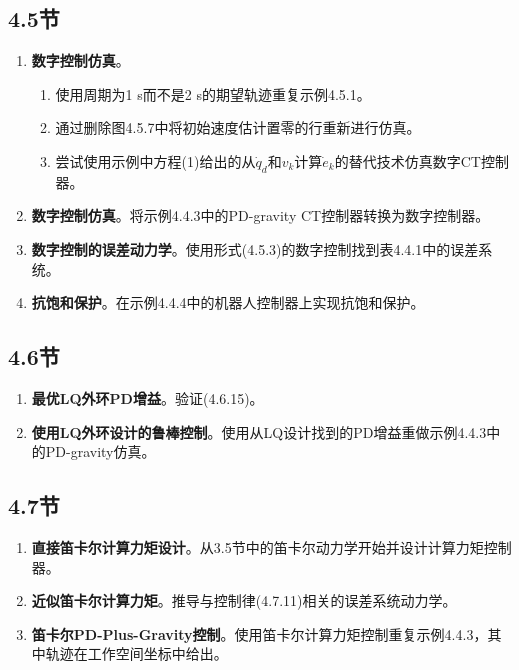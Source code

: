 \documentclass[UTF8]{ctexart}
\theoremstyle{definition}
\begin{document}
\subsection*{4.5节}
\begin{enumerate}[label=4.5--\arabic*, resume]
\item \textbf{数字控制仿真}。
\begin{enumerate}[label=(\alph*)]
\item 使用周期为1 s而不是2 s的期望轨迹重复示例4.5.1。
\item 通过删除图4.5.7中将初始速度估计置零的行重新进行仿真。
\item 尝试使用示例中方程(1)给出的从$\dot{q}_d$和$v_k$计算$\dot{e}_k$的替代技术仿真数字CT控制器。
\end{enumerate}

\item \textbf{数字控制仿真}。将示例4.4.3中的PD-gravity CT控制器转换为数字控制器。

\item \textbf{数字控制的误差动力学}。使用形式(4.5.3)的数字控制找到表4.4.1中的误差系统。

\item \textbf{抗饱和保护}。在示例4.4.4中的机器人控制器上实现抗饱和保护。
\end{enumerate}

\subsection*{4.6节}
\begin{enumerate}[label=4.6--\arabic*, resume]
\item \textbf{最优LQ外环PD增益}。验证(4.6.15)。

\item \textbf{使用LQ外环设计的鲁棒控制}。使用从LQ设计找到的PD增益重做示例4.4.3中的PD-gravity仿真。
\end{enumerate}

\subsection*{4.7节}
\begin{enumerate}[label=4.7--\arabic*, resume]
\item \textbf{直接笛卡尔计算力矩设计}。从3.5节中的笛卡尔动力学开始并设计计算力矩控制器。

\item \textbf{近似笛卡尔计算力矩}。推导与控制律(4.7.11)相关的误差系统动力学。

\item \textbf{笛卡尔PD-Plus-Gravity控制}。使用笛卡尔计算力矩控制重复示例4.4.3，其中轨迹在工作空间坐标中给出。
\end{enumerate}
\end{document}
